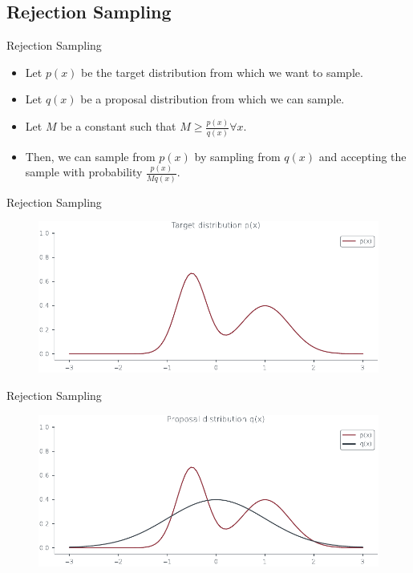 \documentclass{beamer}
\begin{document}
\subsection{Rejection Sampling}
    \begin{frame}{Rejection Sampling}
        \begin{itemize}
            \item Let $p(x)$ be the target distribution from which we want to sample.
            \item Let $q(x)$ be a proposal distribution from which we can sample.
            \item Let $M$ be a constant such that $M \geq \frac{p(x)}{q(x)} \forall x$.
            \item Then, we can sample from $p(x)$ by sampling from $q(x)$ and accepting the sample with probability $\frac{p(x)}{M q(x)}$.
        \end{itemize}
        
    \end{frame}

   \begin{frame}{Rejection Sampling}
    \begin{figure}
        \centering
        \includegraphics[scale = 0.75]{../figures/sampling/rejection-sampling--1.0-False-False-False-False-False-False-False-False.pdf}
    \end{figure}
    
   \end{frame}

    \begin{frame}{Rejection Sampling}
        \begin{figure}
            \centering
            \includegraphics[scale = 0.75]{../figures/sampling/rejection-sampling--1.0-True-False-False-False-False-False-False-False.pdf}
        \end{figure}
    \end{frame}
\end{document}
